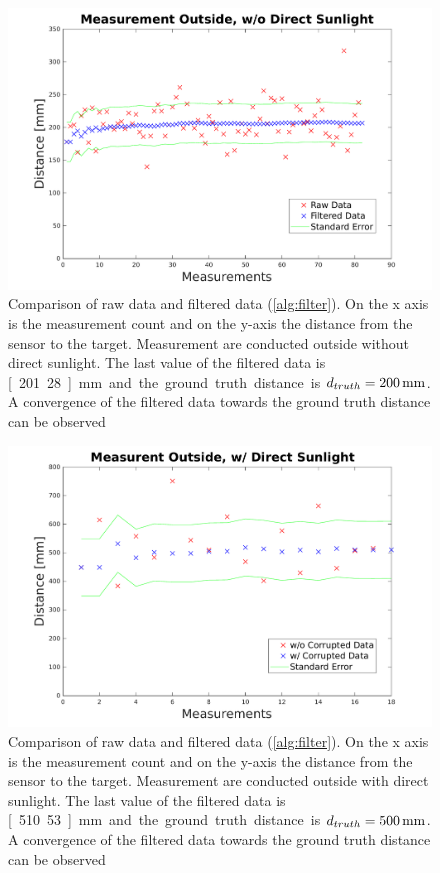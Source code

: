 \begin{figure}
	\centering
	\includegraphics[width=0.9\linewidth]{pictures/plot_filter_shadow.pdf}
	\caption{Comparison of raw data and filtered data (\cref{alg:filter}). On the x axis is the measurement count and on the y-axis the distance from the sensor to the target. Measurement are conducted outside without direct sunlight. The last value of the filtered data is \unit[201.28]{mm} and the ground truth distance is $d_{truth}=\unit[200]{mm}$. A convergence of the filtered data towards the ground truth distance can be observed}
	\label{fig:meas_out_shadow filter}
\end{figure}
\begin{figure}
	\centering
	\includegraphics[width=0.9\linewidth]{pictures/plot_filter_sun.pdf}
	\caption{Comparison of raw data and filtered data (\cref{alg:filter}). On the x axis is the measurement count and on the y-axis the distance from the sensor to the target. Measurement are conducted outside with direct sunlight. The last value of the filtered data is \unit[510.53]{mm} and the ground truth distance is $d_{truth}=\unit[500]{mm}$. A convergence of the filtered data towards the ground truth distance can be observed}
	\label{fig:meas_out_sun filter}
\end{figure}
